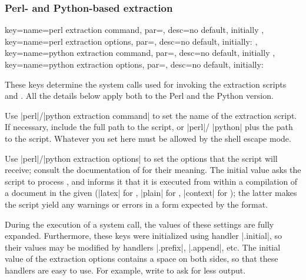 \documentclass[a4paper,11pt]{article}
\begin{document}
\subsubsection{Perl- and Python-based extraction}
\label{sec:ref:extraction-perl-python}

\begin{doc}{
    key={name=perl extraction command, par=,
      desc={no default, initially }},
    key={name=perl extraction options, par=,
      desc={no default, initially: }},
    key={name=python extraction command, par=, desc={no
        default, initially }}, key={name=python
      extraction options, par=, desc={no default, initially:
        }}
  }
  
  These keys determine the system calls used for invoking the extraction
  scripts  and .
  All the details below apply both to the Perl and the Python version.

  Use |perl|\slash|python extraction command| to set the name of the extraction
  script.  If necessary, include the full path to the script, or |perl|\slash
  |python| plus the path to the script.  Whatever you set here must be allowed
  by the shell escape mode.

  Use |perl|\slash|python extraction options| to set the options that the
  script will receive; consult the documentation of
   for their meaning.  The initial value asks the
  script to process \dmmz, and informs it that it is
  executed from within a  compilation of a document in the given
   (|latex| for , |plain| for ,
  |context| for ); the latter makes the script yield any
  warnings or errors in a form expected by the format.

  During the execution of a system call, the values of these settings are fully
  expanded.  Furthermore, these keys were initialized using 
  handler |.initial|, so their values may be modified by handlers |.prefix|,
  |.append|, etc.  The initial value of the extraction options contains a space
  on both sides, so that these handlers are easy to use.  For example, write
   to ask
  for less output.
\end{doc}
\end{document}
